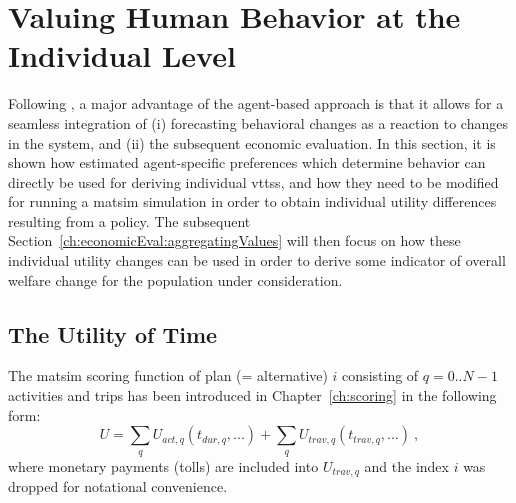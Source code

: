 \section{Valuing Human Behavior at the Individual Level}
\label{ch:economicEval:valuingBehavior}
Following \citet{deJongEtAl2007LogsumTRA}, a major advantage of the agent-based approach is that it allows for a seamless integration of (i) forecasting behavioral changes as a reaction to changes in the system, and (ii) the subsequent economic evaluation.
%
In this section, it is shown how estimated agent-specific preferences which determine behavior can directly be used for deriving individual \glspl{vtts}, and how they need to be modified for running a \gls{matsim} simulation in order to obtain individual utility differences resulting from a policy.
%
The subsequent Section~\ref{ch:economicEval:aggregatingValues} will then focus on how these individual utility changes can be used in order to derive some indicator of overall welfare change for the population under consideration.

\subsection{The Utility of Time}
\label{sec:scor-funct-revisited}
The \acrshort{matsim} scoring function of plan (= alternative) $i$ consisting of $q = 0..N-1$ activities and trips has been introduced in Chapter~\ref{ch:scoring} in the following form:\
\begin{equation}
U = \sum_q U_{act,q}(t_{dur,q}, ...) + \sum_q U_{trav,q}(t_{trav,q}, ...) 
%
\ ,
\label{eq:scoring-fct-revisited}
\end{equation}
where monetary payments (\eg tolls) are included into $U_{trav,q}$ and the index $i$ was dropped for notational convenience.


